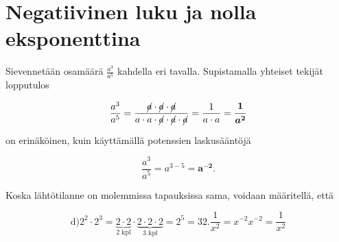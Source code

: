 \section*{Negatiivinen luku ja nolla eksponenttina}

Sievennetään osamäärä $\frac{a^3}{a^5}$ kahdella eri tavalla. Supistamalla yhteiset tekijät lopputulos

\begin{equation*}
\frac{a^3}{a^5}=\frac{\cancel{a}\cdot \cancel{a}\cdot \cancel{a}}{a\cdot a\cdot \cancel{a}\cdot \cancel{a}\cdot \cancel{a}}=\frac{1}{a\cdot a}=\boldsymbol{\frac{1}{a^2}}
\end{equation*}

on erinäköinen, kuin käyttämällä potenssien laskusääntöjä

\begin{equation*}
\frac{a^3}{a^5}=a^{3-5}=\boldsymbol {a^{-2}}{.}
\end{equation*}

Koska lähtötilanne on molemmissa tapauksissa sama, voidaan määritellä, että

\begin{equation}

\text{d)} 2^2\cdot 2^3=\underbrace{2\cdot 2}_{2\textrm{ kpl}}\cdot \underbrace{2\cdot 2\cdot 2}_{3\textrm{ kpl}}=2^5=32.
\frac{1}{x^2}=x^{-2}
x^{-2}=\frac{1}{x^2}
\end{equation}

